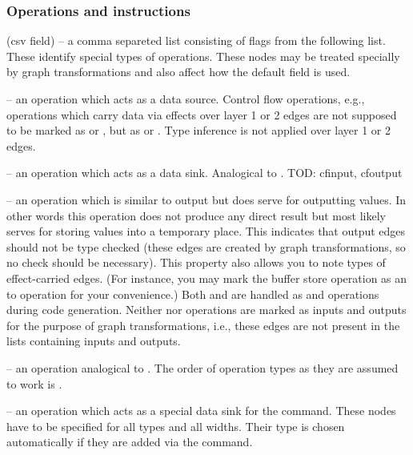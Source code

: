 \subsubsection{Operations and instructions}
  \begin{description}
  \item {} (csv field) -- a comma separeted list consisting of flags from the following list. These identify special types of operations. These nodes may be treated specially by graph transformations and also affect how the default  field is used.
  \begin{description}
    \item {} -- an operation which acts as a data source. Control flow operations, e.g., operations which carry data via effects over layer 1 or 2 edges are not supposed to be marked as  or , but as  or . Type inference is not applied over layer 1 or 2 edges.
    \item {} -- an operation which acts as a data sink. Analogical to .
      TOD: cfinput, cfoutput
    \item {} -- an operation which is similar to output but does serve for outputting values. In other words this operation does not produce any direct result but most likely serves for storing values into a temporary place. This indicates that output edges should not be type checked (these edges are created by graph transformations, so no check should be necessary). This property also allows you to note types of effect-carried edges. (For instance, you may mark the buffer store operation as an  to  operation for your convenience.)  Both  and  are handled as  and  operations during code generation. Neither  nor  operations are marked as inputs and outputs for the purpose of graph transformations, i.e., these edges are not present in the lists containing inputs and outputs.
    \item {} -- an operation analogical to . The order of operation types as they are assumed to work is .
    \item {} -- an operation which acts as a special data sink for the  command. These nodes have to be specified for all types and all widths. Their type is chosen automatically if they are added via the  command.

\end{description}
\end{description}
